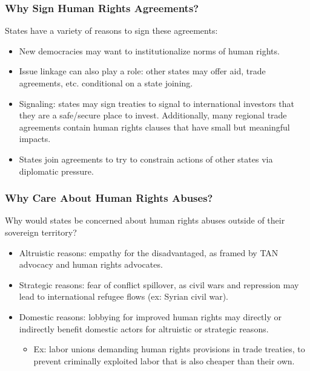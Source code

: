 \documentclass[handout]{beamer}
\begin{document}
\begin{frame} 
	\frametitle{\LARGE{Why Sign Human Rights Agreements?}}
	States have a variety of reasons to sign these agreements:
	\begin{itemize}
		\item New democracies may want to institutionalize norms of human rights. \pause
		\item Issue linkage can also play a role: other states may offer aid, trade agreements, etc. conditional on a state joining. \pause 
		\item Signaling: states may sign treaties to signal to international investors that they are a safe/secure place to invest. Additionally, many regional trade agreements contain human rights clauses that have small but meaningful impacts. \pause
		\item States join agreements to try to constrain actions of other states via diplomatic pressure.
		
	\end{itemize}
\end{frame}

\begin{frame} 
	\frametitle{\LARGE{Why Care About Human Rights Abuses?}}
	Why would states be concerned about human rights abuses outside of their sovereign territory?
	\begin{itemize}
		\item Altruistic reasons: empathy for the disadvantaged, as framed by TAN advocacy and human rights advocates. \pause
		\item Strategic reasons: fear of conflict spillover, as civil wars and repression may lead to international refugee flows (ex: Syrian civil war). \pause 
		\item Domestic reasons: lobbying for improved human rights may directly or indirectly benefit domestic actors for altruistic or strategic reasons. \pause
		\begin{itemize}
			\item Ex: labor unions demanding human rights provisions in trade treaties, to prevent criminally exploited labor that is also cheaper than their own.
		\end{itemize} 
		
	\end{itemize}
\end{frame}
\end{document}
